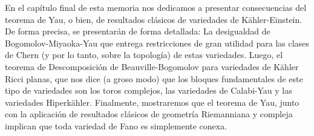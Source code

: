 \vspace{2mm}

En el cap\'itulo final de esta memoria nos dedicamos a presentar consecuencias del teorema de Yau, o bien, de resultados cl\'asicos de variedades de K\"{a}hler-Einstein. De forma precisa, se presentar\'an de forma detallada: La desigualdad de Bogomolov-Miyaoka-Yau que entrega restricciones de gran utilidad para las clases de Chern (y por lo tanto, sobre la topolog\'ia) de estas variedades. Luego, el teorema de Descomposici\'on de Beauville-Bogomolov para variedades de K\"{a}hler Ricci planas, que nos dice (a groso modo) que los bloques fundamentales de este tipo de variedades son los toros complejos, las variedades de Calabi-Yau y las variedades Hiperk\"{a}hler. Finalmente, mostraremos que el teorema de Yau, junto con la aplicaci\'on de resultados cl\'asicos de geometr\'ia Riemanniana y compleja implican que toda variedad de Fano es simplemente conexa.
